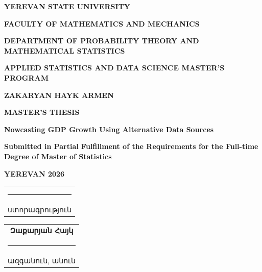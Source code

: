 \documentclass[12pt,a4paper]{report}
\begin{document}
        \begin{titlepage}
        \begin{center}
        {\sffamily\bfseries\Large YEREVAN STATE UNIVERSITY\par}
        \vspace{0.6cm}
        {\sffamily\bfseries\Large FACULTY OF MATHEMATICS AND MECHANICS\par}
        \vspace{1.4cm}
        {\sffamily\bfseries\Large DEPARTMENT OF PROBABILITY THEORY AND MATHEMATICAL STATISTICS\par}
        \vspace{1.8cm}
        {\sffamily\bfseries\Large APPLIED STATISTICS AND DATA SCIENCE MASTER'S PROGRAM\par}
        \vspace{2.1cm}
        {\sffamily\bfseries\Large ZAKARYAN HAYK ARMEN\par}
        \vspace{1.5cm}
        {\sffamily\bfseries\LARGE MASTER'S THESIS\par}
        \vspace{1.5cm}
        {\sffamily\bfseries\Large Nowcasting GDP Growth Using Alternative Data Sources\par}
        \vspace{1.4cm}
        {\sffamily\bfseries\large Submitted in Partial Fulfillment of the Requirements for the Full-time Degree of Master of Statistics\par}
        \vfill
        {\sffamily\bfseries\Large YEREVAN 2026\par}
        \end{center}
        \end{titlepage}

        \clearpage
        \thispagestyle{empty}
        \vspace*{1.3cm}

        \hfill
        \begin{tabular}[t]{c}
        \rule{9.0cm}{0.4pt} \\[-0.1cm]
        \footnotesize\textarmenian{ստորագրություն}
        \end{tabular} \vspace{0.8cm}

        \begin{center}
        \begin{tabular}{c}
        {\armenianfrontfont\bfseries Զաքարյան Հայկ} \\[-0.1cm]
        \rule{15.0cm}{0.4pt} \\[-0.1cm]
        \footnotesize\textarmenian{ազգանուն, անուն}
        \end{tabular}
        \end{center} \vspace{1.2cm}
\end{document}
